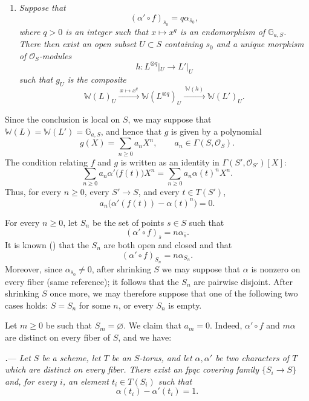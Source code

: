 \begin{enumerate}
\item[\textup{\SGAInlineRefTarget{sga3:xix:proposition:4:12:item:c}(c)}]
\textit{Suppose that}
\[
  (\alpha'\circ f)_{\bar s_0}=q\alpha_{\bar s_0},
\]
\textit{where \(q>0\) is an integer such that
\(x\longmapsto x^q\) is an endomorphism of
\(\mathbb G_{a,S}\).  There then exist an open subset \(U\subset S\)
containing \(s_0\) and a unique morphism of
\(\mathcal O_S\)-modules}
\[
  h\colon L^{\otimes q}|_U\longrightarrow L'|_U
\]
\textit{such that \(g_U\) is the composite}
\[
  \mathbb W(L)_U
  \xrightarrow{\ x\mapsto x^q\ }
  \mathbb W(L^{\otimes q})_U
  \xrightarrow{\ \mathbb W(h)\ }
  \mathbb W(L')_U.
\]
\end{enumerate}

Since the conclusion is local on \(S\),
we may suppose that
\(\mathbb W(L)=\mathbb W(L')=\mathbb G_{a,S}\), and hence that \(g\)
is given by a polynomial
\[
  g(X)=\sum_{n\geq0}a_nX^n,
  \qquad
  a_n\in\Gamma(S,\mathcal O_S).
\]
The condition relating \(f\) and \(g\) is written as an
identity in \(\Gamma(S',\mathcal O_{S'})[X]\):
\[
  \sum_{n\geq0}a_n\alpha'\bigl(f(t)\bigr)X^n
  =
  \sum_{n\geq0}a_n\alpha(t)^nX^n.
\]
Thus, for every \(n\geq0\), every \(S'\to S\), and every
\(t\in T(S')\),
\[
  a_n\bigl(\alpha'(f(t))-\alpha(t)^n\bigr)=0.
\]

For every \(n\geq0\), let \(S_n\) be the set of points \(s\in S\)
such that
\[
  (\alpha'\circ f)_{\bar s}=n\alpha_{\bar s}.
\]
It is known \textup{()} that the \(S_n\) are both open
and closed and that
\[
  (\alpha'\circ f)_{S_n}=n\alpha_{S_n}.
\]
Moreover, since \(\alpha_{\bar s_0}\ne0\), after shrinking \(S\) we
may suppose that \(\alpha\) is nonzero on every fiber \textup{(same
reference)}; it follows that the \(S_n\) are pairwise disjoint.
After shrinking \(S\) once more, we may therefore suppose that one
of the following two cases holds: \(S=S_n\) for some \(n\), or every
\(S_n\) is empty.

Let \(m\geq0\) be such that \(S_m=\varnothing\).  We claim that
\(a_m=0\).  Indeed, \(\alpha'\circ f\) and \(m\alpha\) are distinct
on every fiber of \(S\), and we have:

\par\medskip\noindent
\textbf{\textit{.}}---
\textit{Let \(S\) be a scheme, let \(T\) be an \(S\)-torus, and let
\(\alpha,\alpha'\) be two characters of \(T\) which are distinct on
every fiber.  There exist an fpqc covering family
\(\{S_i\to S\}\) and, for every \(i\), an element \(t_i\in T(S_i)\)
such that}
\[
  \alpha(t_i)-\alpha'(t_i)=1.
\]

